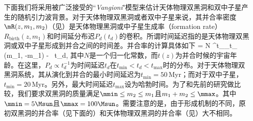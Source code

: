 下面我们将采用被广泛接受的``\textit{Vangioni}"模型\citep{Dvorkin:2016wac}来估计天体物理双黑洞和双中子星产生的随机引力波背景。对于天体物理双黑洞或者双中子星来说，其并合率密度$\mR(z,m_{1},m_{2})$（见）是天体物理黑洞或中子星生成率（formation rate）$R_{\mathrm{birth}}(z,m_{1})$和时间延分布迟$P_{d} \left(t_{d} \right)$的卷积。所谓时间延迟指的是天体物理双黑洞或双中子星形成到并合之间的时间差。并合率的计算具体如下
\e\label{sBHR1}
\mR= N \int^{t_{}}_{t_{}}  
{\min(m_1, \mmax-m_1) - \mmin}\ \rmd t_d,
\q
其中$N$是一个归一化常数，而$t(z)$为并合时候的宇宙年龄。在这里，$P_{d} \propto t_{d}^{-1}$为时间延迟$t_{d}$在$t_{\mathrm{min}} < t_{d} < t_{\mathrm{max}}$时的分布\citep{Abbott:2017xzg}。对于天体物理双黑洞系统，其从演化到并合的最小时间延迟为$t_{\mathrm{min}} = 50$\,Myr；而对于双中子星，$t_{\mathrm{min}} = 20$\,Myr。另外，最大时间延迟$t_{\mathrm{max}}$设为哈勃时间。为了和先前的研究\citep{Abbott:2017vtc,Abbott:2017xzg}做比较，我们要求双黑洞的质量满足$\mmin \leq m_2 \leq m_1$且$m_1 + m_2 \leq \mmax$。其中$ \mmin = 5\Msun$且$\mmax = 100\Msun$。需要注意的是，由于形成机制的不同，原初双黑洞的并合率（见下面的）和天体物理双黑洞的并合率（见）大不相同。


